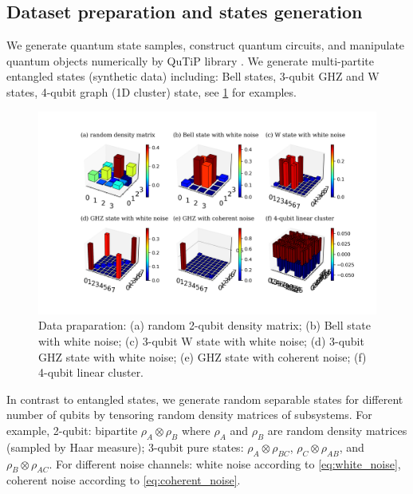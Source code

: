 \documentclass[
aps,
pra,
twocolumn,
floatfix,
]{revtex4-2}
\theoremstyle{plain}
\theoremstyle{definition}
\newcommand{\dm}{\rho}
\begin{document}
\subsection{Dataset preparation and states generation}\label{sec:data}
We generate quantum state samples, construct quantum circuits, and manipulate quantum objects numerically by QuTiP library \cite{johanssonQuTiPPythonFramework2013} \cite{liPulselevelNoisyQuantum2022}.
We generate multi-partite entangled states (synthetic data) including: Bell states, 3-qubit GHZ and W states, 4-qubit graph (1D cluster) state, see \cref{fig:sample_data} for examples.
\begin{figure}[!ht]
	\centering
	\includegraphics[width=.9\linewidth]{./Code/dataset_sample_3x2.png}
	\caption{Data praparation: (a) random 2-qubit density matrix; (b) Bell state with white noise; (c) 3-qubit W state with white noise; (d) 3-qubit GHZ state with white noise; (e) GHZ state with coherent noise; (f) 4-qubit linear cluster.}
	\label{fig:sample_data}
\end{figure}
In contrast to entangled states, we generate random separable states for different number of qubits by tensoring random density matrices of subsystems.
For example,
2-qubit: bipartite $\rho_A\otimes \rho_B$ where $\rho_A$ and $\rho_B$ are random density matrices (sampled by Haar measure);
3-qubit pure states: $\dm_A\otimes \dm_{BC}$, $\dm_C\otimes \dm_{AB}$, and $\dm_B\otimes \dm_{AC}$.
For different noise channels: white noise according to \cref{eq:white_noise}, coherent noise according to \cref{eq:coherent_noise}.
\end{document}
